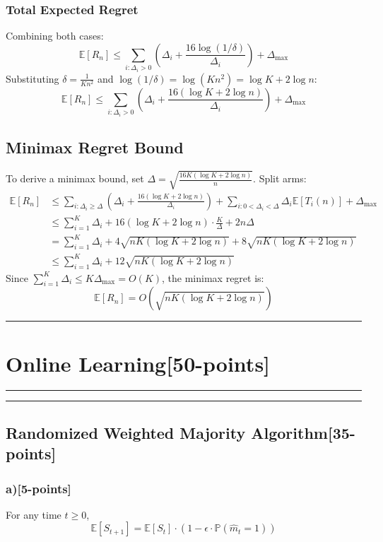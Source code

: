 \documentclass[12pt]{article}
\begin{document}
{{\subsubsection*{Total Expected Regret}
Combining both cases:
\[
\mathbb{E}[R_n] \leq \sum_{i:\Delta_i > 0} \left( \Delta_i + \frac{16\log(1/\delta)}{\Delta_i} \right) + \Delta_{\max}
\]
Substituting $\delta = \frac{1}{Kn^2}$ and $\log(1/\delta) = \log(Kn^2) = \log K + 2\log n$:
\[
\mathbb{E}[R_n] \leq \sum_{i:\Delta_i > 0} \left( \Delta_i + \frac{16(\log K + 2\log n)}{\Delta_i} \right) + \Delta_{\max}
\]

\subsection*{Minimax Regret Bound}
To derive a minimax bound, set $\Delta = \sqrt{\frac{16K(\log K + 2\log n)}{n}}$. Split arms:
\begin{align*}
\mathbb{E}[R_n] &\leq \sum_{i:\Delta_i \geq \Delta} \left( \Delta_i + \frac{16(\log K + 2\log n)}{\Delta_i} \right) + \sum_{i: 0 < \Delta_i < \Delta} \Delta_i \mathbb{E}[T_i(n)] + \Delta_{\max} \\
&\leq \sum_{i=1}^K \Delta_i + 16(\log K + 2\log n) \cdot \frac{K}{\Delta} + 2n\Delta \\
&= \sum_{i=1}^K \Delta_i + 4\sqrt{nK(\log K + 2\log n)} + 8\sqrt{nK(\log K + 2\log n)} \\
&\leq \sum_{i=1}^K \Delta_i + 12\sqrt{nK(\log K + 2\log n)}
\end{align*}
Since $\sum_{i=1}^K \Delta_i \leq K \Delta_{\max} = O(K)$, the minimax regret is:
\[
\mathbb{E}[R_n] = O\left( \sqrt{nK(\log K + 2\log n)} \right)
\]



}}

\newpage
\noindent\rule{\textwidth}{1.5pt}
\section{Online Learning[50-points]}
\noindent\rule{\textwidth}{1.5pt}
\noindent\rule{\textwidth}{0.2pt}
\subsection{Randomized Weighted Majority Algorithm[35-points]}
\subsubsection{a)[5-points]}
For any time $t \geq 0$,
\[
\mathbb{E}[S_{t+1}] = \mathbb{E}[S_{t}] \cdot (1 - \epsilon \cdot \mathbb{P}(\hat{m}_t = 1))
\]
\end{document}
